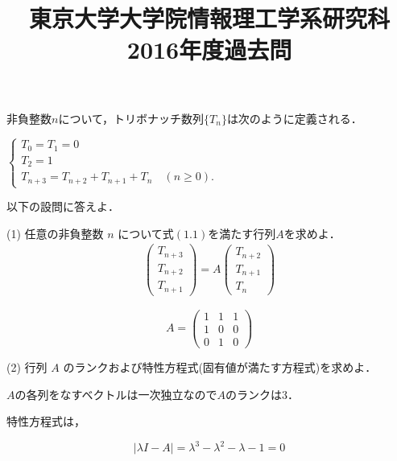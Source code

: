 \documentclass[a4j]{jarticle}
\title{東京大学大学院情報理工学系研究科2016年度過去問}
\author{}
\date{}
\let \ds \displaystyle
\begin{document}
\thispagestyle{empty}
\maketitle
\pagebreak


\section{}

\begin{screen}
 非負整数$n$について，トリボナッチ数列$\{T_n\}$は次のように定義される．
 
 $\ds \begin{cases} T_0 = T_1 = 0 \\ T_2 = 1 \\ T_{n+3} = T_{n+2} + T_{n+1} + T_{n} \quad(n \geq 0).\end{cases}$

 以下の設問に答えよ．
\end{screen}

\begin{screen}
 (1) 任意の非負整数 $n$ について式$(1.1)$を満たす行列$A$を求めよ．
 \begin{align*}
  \left(\begin{array}{l}T_{n+3} \\ T_{n+2} \\T_{n+1}\end{array}\right)
  =A\left(\begin{array}{l}T_{n+2} \\ T_{n+1} \\T_{n}\end{array}\right)\tag{1.1}
 \end{align*}
\end{screen}

$$A=\begin{pmatrix}
     1 & 1 & 1 \\
     1 & 0 & 0 \\
     0 & 1 & 0      
    \end{pmatrix}$$

\begin{screen}
 (2) 行列 $A$ のランクおよび特性方程式(固有値が満たす方程式)を求めよ．
\end{screen}

$A$の各列をなすベクトルは一次独立なので$A$のランクは$3$．

特性方程式は，

$$\left|\lambda I - A\right| = \lambda^3 - \lambda^2 - \lambda - 1 = 0$$
\end{document}
